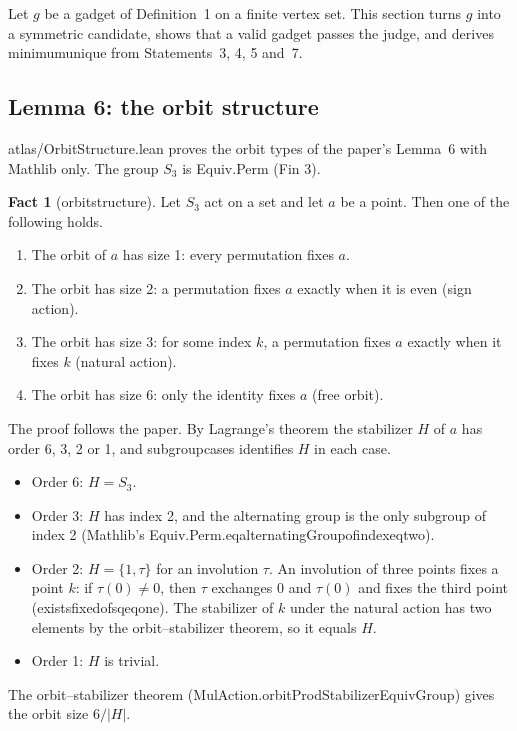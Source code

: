 \documentclass[11pt,a4paper]{article}
\newcommand{\leanus}{\textunderscore\allowbreak}
\newcommand{\lean}[1]{{\ttfamily\let\_\leanus #1}}
\theoremstyle{definition}
\newtheorem{fact}{Fact}
\begin{document}
Let $g$ be a gadget of Definition~1 on a finite vertex set. This section
turns $g$ into a symmetric candidate, shows that a valid gadget passes the
judge, and derives \lean{minimum\_unique} from Statements~3, 4, 5 and~7.

\subsection{Lemma 6: the orbit structure}\label{sec:lemma6}
\lean{atlas/OrbitStructure.lean} proves the orbit types of the paper's
Lemma~6 with Mathlib only. The group $S_3$ is \lean{Equiv.Perm (Fin 3)}.

\begin{fact}[\lean{orbit\_structure}]
Let $S_3$ act on a set and let $a$ be a point. Then one of the following
holds.
\begin{enumerate}
\item The orbit of $a$ has size 1: every permutation fixes $a$.
\item The orbit has size 2: a permutation fixes $a$ exactly when it is even
(sign action).
\item The orbit has size 3: for some index $k$, a permutation fixes $a$
exactly when it fixes $k$ (natural action).
\item The orbit has size 6: only the identity fixes $a$ (free orbit).
\end{enumerate}
\end{fact}

The proof follows the paper. By Lagrange's theorem the stabilizer $H$ of $a$
has order 6, 3, 2 or 1, and \lean{subgroup\_cases} identifies $H$ in each
case.
\begin{itemize}
\item Order 6: $H=S_3$.
\item Order 3: $H$ has index 2, and the alternating group is the only
subgroup of index 2 (Mathlib's
\lean{Equiv.Perm.eq\_alternatingGroup\_of\_index\_eq\_two}).
\item Order 2: $H=\{1,\tau\}$ for an involution $\tau$. An involution of three
points fixes a point $k$: if $\tau(0)\neq 0$, then $\tau$ exchanges $0$ and
$\tau(0)$ and fixes the third point (\lean{exists\_fixed\_of\_sq\_eq\_one}).
The stabilizer of $k$ under the natural action has two elements by the
orbit--stabilizer theorem, so it equals $H$.
\item Order 1: $H$ is trivial.
\end{itemize}
The orbit--stabilizer theorem
(\lean{MulAction.orbitProdStabilizerEquivGroup}) gives the orbit size
$6/|H|$.
\end{document}
